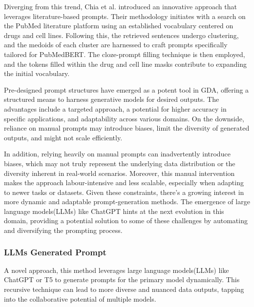 \documentclass[preprint,12pt,authoryear]{elsarticle}
\begin{document}
Diverging from this trend, Chia et al. \cite{116_prompt_structure} introduced an innovative approach that leverages literature-based prompts. Their methodology initiates with a search on the PubMed literature platform using an established vocabulary centered on drugs and cell lines. Following this, the retrieved sentences undergo clustering, and the medoids of each cluster are harnessed to craft prompts specifically tailored for PubMedBERT\cite{120_pubbert}. The cloze-prompt filling technique is then employed, and the tokens filled within the drug and cell line masks contribute to expanding the initial vocabulary.



Pre-designed prompt structures have emerged as a potent tool in GDA, offering a structured means to harness generative models for desired outputs. The advantages include a targeted approach, a potential for higher accuracy in specific applications, and adaptability across various domains. On the downside, reliance on manual prompts may introduce biases, limit the diversity of generated outputs, and might not scale efficiently. 

In addition, relying heavily on manual prompts can inadvertently introduce biases, which may not truly represent the underlying data distribution or the diversity inherent in real-world scenarios. Moreover, this manual intervention makes the approach labour-intensive and less scalable, especially when adapting to newer tasks or datasets. Given these constraints, there's a growing interest in more dynamic and adaptable prompt-generation methods. The emergence of large language models(LLMs) \cite{123_llm,124_llm}like ChatGPT hints at the next evolution in this domain, providing a potential solution to some of these challenges by automating and diversifying the prompting process.

\subsubsection{LLMs Generated Prompt}
A novel approach, this method leverages large language models(LLMs) like ChatGPT or T5\cite{150_T5} to generate prompts for the primary model dynamically. This recursive technique can lead to more diverse and nuanced data outputs, tapping into the collaborative potential of multiple models.
\end{document}
